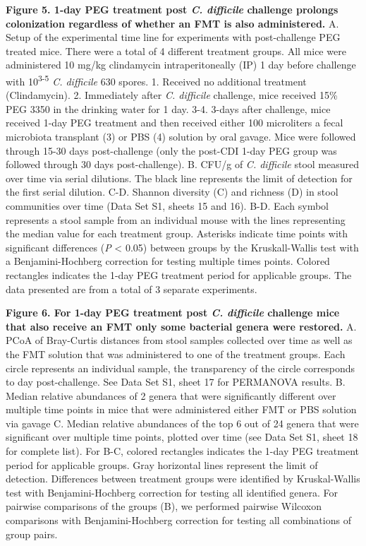 \documentclass[
  11pt,
]{article}
\begin{document}
\textbf{Figure 5. 1-day PEG treatment post \emph{C. difficile} challenge
prolongs colonization regardless of whether an FMT is also
administered.} A. Setup of the experimental time line for experiments
with post-challenge PEG treated mice. There were a total of 4 different
treatment groups. All mice were administered 10 mg/kg clindamycin
intraperitoneally (IP) 1 day before challenge with
10\textsuperscript{3-5} \emph{C. difficile} 630 spores. 1. Received no
additional treatment (Clindamycin). 2. Immediately after \emph{C.
difficile} challenge, mice received 15\% PEG 3350 in the drinking water
for 1 day. 3-4. 3-days after challenge, mice received 1-day PEG
treatment and then received either 100 microliters a fecal microbiota
transplant (3) or PBS (4) solution by oral gavage. Mice were followed
through 15-30 days post-challenge (only the post-CDI 1-day PEG group was
followed through 30 days post-challenge). B. CFU/g of \emph{C.
difficile} stool measured over time via serial dilutions. The black line
represents the limit of detection for the first serial dilution. C-D.
Shannon diversity (C) and richness (D) in stool communities over time
(Data Set S1, sheets 15 and 16). B-D. Each symbol represents a stool
sample from an individual mouse with the lines representing the median
value for each treatment group. Asterisks indicate time points with
significant differences (\emph{P} \textless{} 0.05) between groups by
the Kruskall-Wallis test with a Benjamini-Hochberg correction for
testing multiple times points. Colored rectangles indicates the 1-day
PEG treatment period for applicable groups. The data presented are from
a total of 3 separate experiments. \newpage

\textbf{Figure 6. For 1-day PEG treatment post \emph{C. difficile}
challenge mice that also receive an FMT only some bacterial genera were
restored.} A. PCoA of Bray-Curtis distances from stool samples collected
over time as well as the FMT solution that was administered to one of
the treatment groups. Each circle represents an individual sample, the
transparency of the circle corresponds to day post-challenge. See Data
Set S1, sheet 17 for PERMANOVA results. B. Median relative abundances of
2 genera that were significantly different over multiple time points in
mice that were administered either FMT or PBS solution via gavage C.
Median relative abundances of the top 6 out of 24 genera that were
significant over multiple time points, plotted over time (see Data Set
S1, sheet 18 for complete list). For B-C, colored rectangles indicates
the 1-day PEG treatment period for applicable groups. Gray horizontal
lines represent the limit of detection. Differences between treatment
groups were identified by Kruskal-Wallis test with Benjamini-Hochberg
correction for testing all identified genera. For pairwise comparisons
of the groups (B), we performed pairwise Wilcoxon comparisons with
Benjamini-Hochberg correction for testing all combinations of group
pairs.
\end{document}
